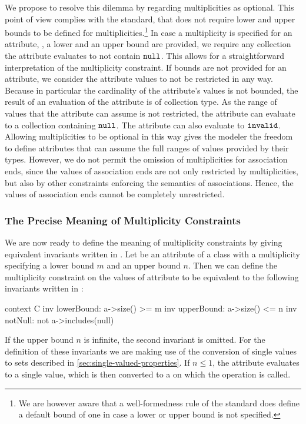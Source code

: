We propose to resolve this dilemma by regarding multiplicities as optional. This
point of view complies with the \UML standard, that does not require lower and
upper bounds to be defined for multiplicities.\footnote{We are however aware
  that a well-formedness rule of the \UML standard does define a default bound
  of one in case a lower or upper bound is not specified.} In case a
multiplicity is specified for an attribute, \ie, a lower and an upper bound
are provided, we require any collection the attribute evaluates to not
contain $\mathtt{null}$. This allows for a straightforward interpretation of
the multiplicity constraint. If bounds are not provided for an attribute, we
consider the attribute values to not be restricted in any way. Because in
particular the cardinality of the attribute's values is not bounded, the result
of an evaluation of the attribute is of collection type. As the range of values
that the attribute can assume is not restricted, the attribute can evaluate to a
collection containing $\mathtt{null}$. The attribute can also evaluate to
$\mathtt{invalid}$. Allowing multiplicities to be optional in this way gives
the modeler the freedom to define attributes that can assume the full ranges of
values provided by their types. However, we do not permit the omission of
multiplicities for association ends, since the values of association ends are
not only restricted by multiplicities, but also by other constraints enforcing
the semantics of associations. Hence, the values of association ends cannot be
completely unrestricted.

\subsubsection{The Precise Meaning of Multiplicity Constraints}
We are now ready to define the meaning of multiplicity constraints by giving
equivalent invariants written in \OCL\@. Let  be an attribute of a
class  with a multiplicity specifying a lower bound $m$ and an
upper bound $n$. Then we can define the multiplicity constraint on the values of
attribute  to be equivalent to the following invariants written in
\OCL:
\begin{ocl}
context C inv lowerBound: a->size() >= m
          inv upperBound: a->size() <= n
          inv notNull: not a->includes(null)
\end{ocl}
If the upper bound $n$ is infinite, the second invariant is omitted. For the
definition of these invariants we are making use of the conversion of single
values to sets described in \autoref{sec:single-valued-properties}. If $n
\leq 1$, the attribute  evaluates to a single value, which is then
converted to a  on which the  operation is
called.

